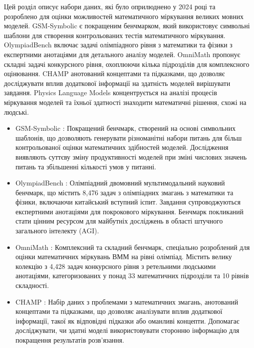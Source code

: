 Цей розділ описує набори даних, які було оприлюднено у 2024 році та розроблено для оцінки можливостей математичного міркування великих мовних моделей. GSM-Symbolic є покращеним бенчмарком, який використовує символьні шаблони для створення контрольованих тестів математичного міркування. OlympiadBench включає задачі олімпіадного рівня з математики та фізики з експертними анотаціями для детального аналізу моделей. OmniMath пропонує складні задачі конкурсного рівня, охоплюючи кілька підрозділів для комплексного оцінювання. CHAMP анотований концептами та підказками, що дозволяє досліджувати вплив додаткової інформації на здатність моделей вирішувати завдання. Physics Language Models концентрується на аналізі процесів міркування моделей та їхньої здатності знаходити математичні рішення, схожі на людські.

\begin{itemize}

    \item {GSM-Symbolic} \cite{mirzadeh2024gsmsymbolicunderstandinglimitationsmathematical}: Покращений бенчмарк, створений на основі символьних шаблонів, що дозволяють генерувати різноманітні набори питань для більш контрольованої оцінки математичних здібностей моделей. Дослідження виявляють суттєву зміну продуктивності моделей при зміні числових значень питань та збільшенні кількості умов у питанні.

    \item {OlympiadBench} \cite{he2024olympiadbenchchallengingbenchmarkpromoting}: Олімпіадний двомовний мультимодальний науковий бенчмарк, що містить 8,476 задач з олімпіадних змагань з математики та фізики, включаючи китайський вступний іспит. Завдання супроводжуються експертними анотаціями для покрокового міркування. Бенчмарк покликаний стати цінним ресурсом для майбутніх досліджень в області штучного загального інтелекту (AGI).

    \item {OmniMath} \cite{gao2024omnimathuniversalolympiadlevel}: Комплексний та складний бенчмарк, спеціально розроблений для оцінки математичних міркувань ВММ на рівні олімпіад. Містить велику колекцію з 4,428 задач конкурсного рівня з ретельними людськими анотаціями, категоризованих у понад 33 математичних підрозділи та 10 рівнів складності.

    \item {CHAMP} \cite{mao2024champcompetitionleveldatasetfinegrained}: Набір даних з проблемами з математичних змагань, анотований концептами та підказками, що дозволяє аналізувати вплив додаткової інформації, такої як відповідні підказки або оманливі концепти. Допомагає досліджувати, чи здатні моделі використовувати сторонню інформацію для покращення результатів розв'язання.


\end{itemize}
